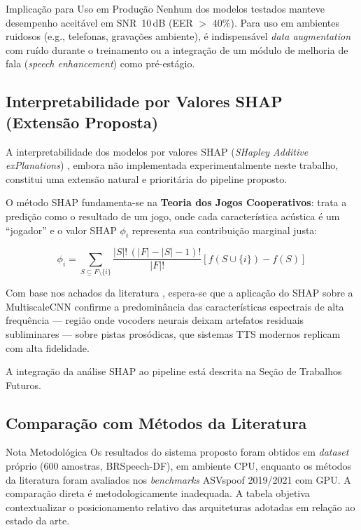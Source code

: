 \documentclass[12pt,a4paper]{article}
\begin{document}
\begin{warningbox}{Implica\c{c}\~{a}o para Uso em Produ\c{c}\~{a}o}
Nenhum dos modelos testados manteve desempenho aceit\'{a}vel em SNR~10\,dB
(EER $>$ 40\%). Para uso em ambientes ruidosos (e.g., telefonas, grava\c{c}\~{o}es
ambiente), \'{e} indispens\'{a}vel \textit{data augmentation} com ru\'{i}do
durante o treinamento ou a integra\c{c}\~{a}o de um m\'{o}dulo de
melhoria de fala (\textit{speech enhancement}) como pr\'{e}-est\'{a}gio.
\end{warningbox}

\subsection{Interpretabilidade por Valores SHAP (Extens\~{a}o Proposta)}

A interpretabilidade dos modelos por valores SHAP (\textit{SHapley Additive
exPlanations}) \cite{lundberg2017unified}, embora n\~{a}o implementada
experimentalmente neste trabalho, constitui uma extens\~{a}o natural e
priorit\'{a}ria do pipeline proposto.

O m\'{e}todo SHAP fundamenta-se na \textbf{Teoria dos Jogos Cooperativos}:
trata a predi\c{c}\~{a}o como o resultado de um jogo, onde cada
caracter\'{i}stica ac\'{u}stica \'{e} um ``jogador'' e o valor SHAP
$\phi_i$ representa sua contribui\c{c}\~{a}o marginal justa:

\begin{equation}
\phi_i = \sum_{S \subseteq F \setminus \{i\}}
\frac{|S|!\,(|F|-|S|-1)!}{|F|!}
\left[f(S \cup \{i\}) - f(S)\right]
\end{equation}

Com base nos achados da literatura \cite{bartusiak2022, todisco2016new},
espera-se que a aplica\c{c}\~{a}o do SHAP sobre a MultiscaleCNN confirme a
predomin\^{a}ncia das caracter\'{i}sticas espectrais de alta frequ\^{e}ncia
--- regi\~{a}o onde vocoders neurais deixam artefatos residuais
subliminares --- sobre pistas pros\'{o}dicas, que sistemas TTS modernos
replicam com alta fidelidade.

A integra\c{c}\~{a}o da an\'{a}lise SHAP ao pipeline est\'{a} descrita
na Se\c{c}\~{a}o de Trabalhos Futuros.

\subsection{Compara\c{c}\~{a}o com M\'{e}todos da Literatura}

\begin{warningbox}{Nota Metodol\'{o}gica}
Os resultados do sistema proposto foram obtidos em \textit{dataset} pr\'{o}prio
(600 amostras, BRSpeech-DF), em ambiente CPU, enquanto os m\'{e}todos da
literatura foram avaliados nos \textit{benchmarks} ASVspoof 2019/2021 com GPU.
A compara\c{c}\~{a}o direta \'{e} metodologicamente inadequada.
A tabela objetiva contextualizar o posicionamento relativo das arquiteturas
adotadas em rela\c{c}\~{a}o ao estado da arte.
\end{warningbox}
\end{document}
